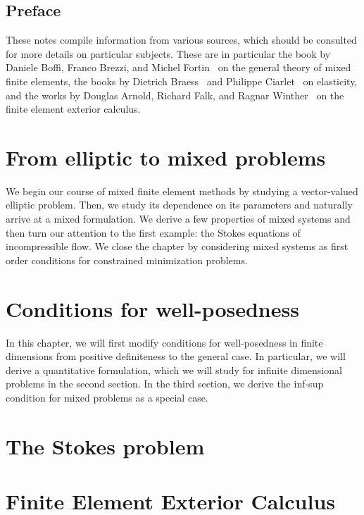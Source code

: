 \maketitle

\section*{Preface}
%

These notes compile information from various sources, which should be
consulted for more details on particular subjects. These are in
particular the book by Daniele Boffi, Franco Brezzi, and Michel
Fortin~\cite{BoffiBrezziFortin13} on the general theory of mixed
finite elements, the books by Dietrich Braess~\cite{Braess97,Braess13}
and Philippe Ciarlet~\cite{Ciarlet88} on elasticity, and the works by
Douglas Arnold, Richard Falk, and Ragnar
Winther~\cite{ArnoldFalkWinther06acta,ArnoldFalkWinther10} on the
finite element exterior calculus.

\thispagestyle{empty}
\setcounter{page}{0}


\tableofcontents

\chapter{From elliptic to mixed problems}
We begin our course of mixed finite element methods by studying a
vector-valued elliptic problem. Then, we study its dependence on its
parameters and naturally arrive at a mixed formulation. We derive a
few properties of mixed systems and then turn our attention to the
first example: the Stokes equations of incompressible flow. We close
the chapter by considering mixed systems as first order conditions
for constrained minimization problems.




\chapter{Conditions for well-posedness}
In this chapter, we will first modify conditions for well-posedness in
finite dimensions from positive definiteness to the general case. In
particular, we will derive a quantitative formulation, which we will
study for infinite dimensional problems in the second section. In the
third section, we derive the inf-sup condition for mixed problems as a
special case.
\label{sec:wellposedness}


\chapter{The Stokes problem}


\chapter{Finite Element Exterior Calculus}


\printbibliography
\printindex


